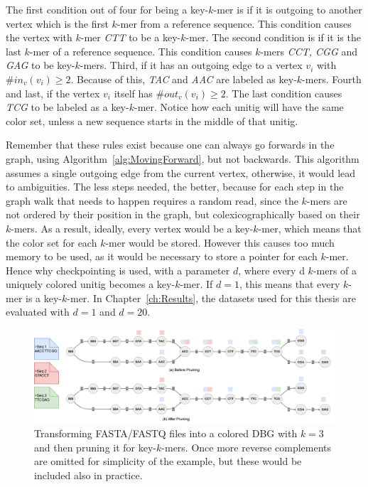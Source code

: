The first condition out of four for being a key-$k$-mer is if it is outgoing to another vertex which is the first $k$-mer from a reference sequence.
This condition causes the vertex with $k$-mer \textit{CTT} to be a key-$k$-mer.
The second condition is if it is the last $k$-mer of a reference sequence.
This condition causes $k$-mers \textit{CCT, CGG} and \textit{GAG} to be key-$k$-mers.
Third, if it has an outgoing edge to a vertex $v_i$ with $\#in_v(v_i) \ge 2$.
Because of this, \textit{TAC} and \textit{AAC} are labeled as key-$k$-mers.
Fourth and last, if the vertex $v_i$ itself has $\#out_v(v_i) \ge 2$.
The last condition causes \textit{TCG} to be labeled as a key-$k$-mer.
Notice how each unitig will have the same color set, unless a new sequence starts in the middle of that unitig.

Remember that these rules exist because one can always go forwards in the graph, using Algorithm~\ref{alg:MovingForward}, but not backwards.
This algorithm assumes a single outgoing edge from the current vertex, otherwise, it would lead to ambiguities.
The less steps needed, the better, because for each step in the graph walk that needs to happen requires a random read, since the $k$-mers are not ordered by their position in the graph, but colexicographically based on their $k$-mers.
As a result, ideally, every vertex would be a key-$k$-mer, which means that the color set for each $k$-mer would be stored.
However this causes too much memory to be used, as it would be necessary to store a pointer for each $k$-mer.
Hence why checkpointing is used, with a parameter $d$, where every d $k$-mers of a uniquely colored unitig becomes a key-$k$-mer.
If $d=1$, this means that every $k$-mer is a key-$k$-mer.
In Chapter~\ref{ch:Results}, the datasets used for this thesis are evaluated with $d=1$ and $d=20$.

\begin{figure}[t]
  \centering
  \includegraphics[width=\textwidth]{images/KeyKmers.png}
  \caption{Transforming FASTA/FASTQ files into a colored DBG with $k=3$ and then pruning it for key-$k$-mers. Once more reverse complements are omitted for simplicity of the example, but these would be included also in practice.}\label{fig:KeyKmers}
\end{figure}

